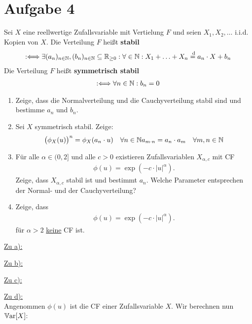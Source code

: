 \documentclass[12pt,a4paper]{article}
\begin{document}
\section*{Aufgabe 4}
Sei $X$ eine reellwertige Zufallsvariable mit Vertielung $F$ und seien $X_1,X_2,\ldots$ i.i.d. Kopien von $X$.
Die Verteilung $F$ heißt \textbf{stabil}
\begin{align*}
	:\Longleftrightarrow
	\exists(a_n)_{n\in\mathbb{N}},(b_n)_{n\in\mathbb{N}}\subseteq\mathbb{R}_{\geq0}:\forall\in\mathbb{N}:
	X_1+\ldots+X_n\overset{\text{ d}}{=}a_n\cdot X+b_n
\end{align*}
Die Verteilung $F$ heißt \textbf{symmetrisch stabil}
\begin{align*}
	:\Longleftrightarrow
	\forall n\in\mathbb{N}:b_n=0
\end{align*}

\begin{enumerate}[label=\alph*)]
	\item Zeige, dass die Normalverteilung und die Cauchyverteilung stabil sind und bestimme $a_n$ und $b_n$.
	\item Sei $X$ symmetrisch stabil.
	Zeige:
	\begin{align*}
		\big(\phi_X(u)\big)^n&=\phi_X(a_n\cdot u) & \forall n\in\mathbb{N}
		a_{m\cdot n}&=a_n\cdot a_m &\forall m,n\in\mathbb{N}
	\end{align*}		
	\item Für alle $\alpha\in(0,2]$ und alle $c>0$ existieren Zufallsvariablen $X_{\alpha,c}$ mit CF 
	\begin{align*}
		\phi(u)=\exp\left(-c\cdot|u|^\alpha\right).
	\end{align*}
	Zeige, dass $X_{\alpha,c}$ stabil ist und bestimmt $a_n$.
	Welche Parameter entsprechen der Normal- und der Cauchyverteilung?
	\item Zeige, dass
	\begin{align*}
		\phi(u)=\exp\left(-c\cdot|u|^\alpha\right).
	\end{align*}
	für $\alpha>2$ \ul{keine} CF ist.
\end{enumerate}

\begin{lösung}
	\underline{Zu a):}
	
	\underline{Zu b):}
	
	\underline{Zu c):}
	
	\underline{Zu d):}\\
	Angenommen $\phi(u)$ ist die CF einer Zufallsvariable $X$.
	Wir berechnen nun $\mathbb{V}\text{ar}[X]$:
	
\end{lösung}
\end{document}
